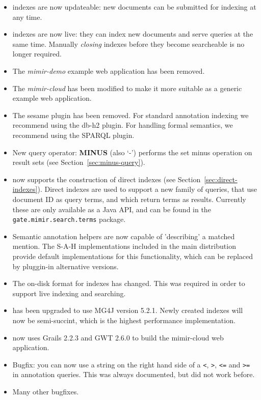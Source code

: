 \begin{itemize}
  \item \Mimir{} indexes are now updateable: new documents can be submitted for
  indexing at any time.
  \item \Mimir{} indexes are now live: they can index new documents and serve
  queries at the same time. Manually {\em closing} indexes before they become
  searcheable is no longer required.
  \item The {\em mimir-demo} example web application has been removed.
  \item The {\em mimir-cloud} has been modified to make it more suitable as a
  generic example web application.
  \item The sesame \Mimir{} plugin has been removed. For standard annotation
  indexing we recommend using the db-h2 plugin. For handling formal semantics,
  we recommend using the SPARQL plugin.
  \item New query operator: {\bf MINUS} (also `-') performs the set minus
  operation on result sets (see Section~\ref{sec:minus-query}).  
  \item \Mimir{} now supports the construction of direct indexes (see
  Section~\ref{sec:direct-indexes}). Direct indexes are used to support a new
  family of queries, that use document ID as query terms, and which return terms
  as results. Currently these are only available as a Java API, and can be found
  in the {\tt gate.mimir.search.terms} package.
  \item Semantic annotation helpers are now capable of 'describing' a matched
  mention. The S-A-H implementations included in the main distribution provide
  default implementations for this functionality, which can be replaced by
  pluggin-in alternative versions.
  \item The on-disk format for \Mimir{} indexes has changed. This was required
  in order to support live indexing  and searching.
  \item \Mimir{} has been upgraded to use MG4J version 5.2.1. Newly created
  indexes will now be semi-succint, which is the highest performance
  implementation.
  \item \Mimir{} now uses Grails 2.2.3 and GWT 2.6.0 to build the mimir-cloud
  web application.
  \item Bugfix: you can now use a string on the right hand side of a \verb!<!,
  \verb!>!, \verb!<=! and \verb!>=! in annotation queries. This was always
  documented, but did not work before.
  \item Many other bugfixes.
\end{itemize}
